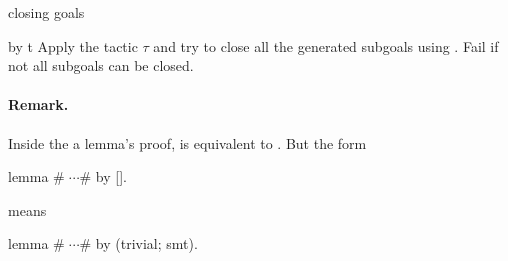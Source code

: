 \begin{tactic}[by $\;\tau$]{closing goals}
  \begin{tsyntax}[empty]{by t}
  Apply the tactic $\tau$ and try to close all the generated subgoals using
  . Fail if not all subgoals can be closed.
  \end{tsyntax}

  \paragraph{Remark.} Inside the a lemma's proof,  is
  equivalent to .  But the form
\begin{easycrypt}{}{}
lemma #$\;\cdots$# by [].
\end{easycrypt}
  means
\begin{easycrypt}{}{}
lemma #$\;\cdots$# by (trivial; smt).
\end{easycrypt}
\end{tactic}
